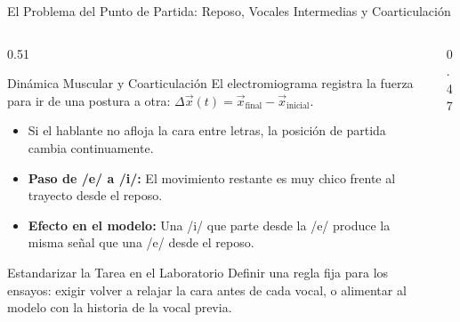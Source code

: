 \begin{frame}{El Problema del Punto de Partida: Reposo, Vocales Intermedias y Coarticulación}
    \begin{columns}[c]
        \begin{column}{0.51\textwidth}
            \scriptsize
            \begin{block}{Dinámica Muscular y Coarticulación}
                El electromiograma registra la fuerza para ir de una postura a otra: $\Delta \vec{x}(t) = \vec{x}_{\text{final}} - \vec{x}_{\text{inicial}}$.
                \begin{itemize}\setlength{\itemsep}{1pt}\setlength{\parskip}{0pt}
                    \item Si el hablante no afloja la cara entre letras, la posición de partida cambia continuamente.
                    \item \textbf{Paso de /e/ a /i/:} El movimiento restante es muy chico frente al trayecto desde el reposo.
                    \item \textbf{Efecto en el modelo:} Una /i/ que parte desde la /e/ produce la misma señal que una /e/ desde el reposo.
                \end{itemize}
            \end{block}
            \vspace{0.1cm}
            \begin{exampleblock}{Estandarizar la Tarea en el Laboratorio}
                Definir una regla fija para los ensayos: exigir volver a relajar la cara antes de cada vocal, o alimentar al modelo con la historia de la vocal previa.
            \end{exampleblock}
        \end{column}
        \begin{column}{0.47\textwidth}
            \centering
        \end{column}
    \end{columns}
\end{frame}
